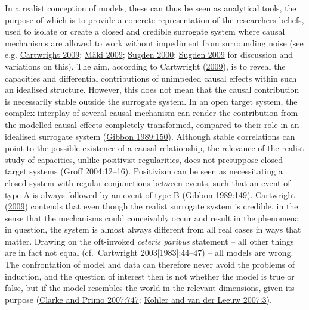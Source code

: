 \documentclass[
  12pt,
  a4paper,
  oneside]{book}
\begin{document}
In a realist conception of models, these can thus be seen as analytical tools, the purpose of which is to provide a concrete representation of the researchers beliefs, used to isolate or create a closed and credible surrogate system where causal mechanisms are allowed to work without impediment from surrounding noise (see e.g. \protect\hyperlink{ref-cartwright2009}{Cartwright 2009}; \protect\hyperlink{ref-muxe4ki2009}{Mäki 2009}; \protect\hyperlink{ref-sugden2000}{Sugden 2000}; \protect\hyperlink{ref-sugden2009}{Sugden 2009} for discussion and variations on this). The aim, according to Cartwright (\protect\hyperlink{ref-cartwright2009}{2009}), is to reveal the capacities and differential contributions of unimpeded causal effects within such an idealised structure. However, this does not mean that the causal contribution is necessarily stable outside the surrogate system. In an open target system, the complex interplay of several causal mechanism can render the contribution from the modelled causal effects completely transformed, compared to their role in an idealised surrogate system (\protect\hyperlink{ref-gibbon1989}{Gibbon 1989:150}). Although stable correlations can point to the possible existence of a causal relationship, the relevance of the realist study of capacities, unlike positivist regularities, does not presuppose closed target systems (Groff 2004:12--16). Positivism can be seen as necessitating a closed system with regular conjunctions between events, such that an event of type A is always followed by an event of type B (\protect\hyperlink{ref-gibbon1989}{Gibbon 1989:149}). Cartwright (\protect\hyperlink{ref-cartwright2009}{2009}) contends that even though the realist surrogate system is credible, in the sense that the mechanisms could conceivably occur and result in the phenomena in question, the system is almost always different from all real cases in ways that matter. Drawing on the oft-invoked \emph{ceteris paribus} statement -- all other things are in fact not equal (cf.~Cartwright 2003{[}1983{]}:44--47) -- all models are wrong. The confrontation of model and data can therefore never avoid the problems of induction, and the question of interest then is not whether the model is true or false, but if the model resembles the world in the relevant dimensions, given its purpose (\protect\hyperlink{ref-clarke2007}{Clarke and Primo 2007:747}; \protect\hyperlink{ref-kohler2007}{Kohler and van der Leeuw 2007:3}).
\end{document}
